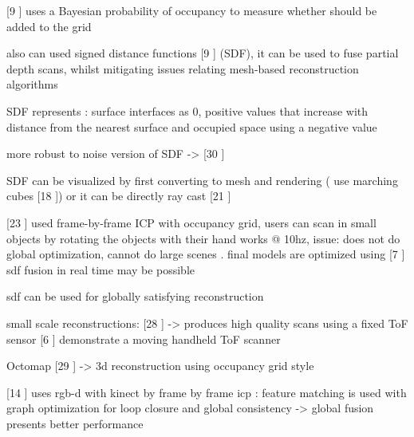 [9 \cite{Elfes87Sensor}] uses a Bayesian probability of occupancy to measure whether should be added to the grid

also can used signed distance functions [9 \cite{Elfes87Sensor}] (SDF), it can be used to fuse partial depth scans, whilst mitigating
issues relating mesh-based reconstruction algorithms

SDF represents : surface interfaces as 0, positive values that increase with distance from the nearest surface
and occupied space using a negative value

more robust to noise version of SDF -> [30 \cite{Zach07Globally} ]

SDF can be visualized by first converting to mesh and rendering ( use marching cubes [18 \cite{Cubes87High}]) or it can be directly ray cast [21 \cite{Parker98Interactive}]

[23 \cite{Rusinkiewicz02Real}] used frame-by-frame ICP with occupancy grid, users can scan in small objects by rotating the objects with their hand
works @ 10hz, issue: does not do global optimization, cannot do large scenes . final models are optimized using [7 \cite{Curless96Volumetric}]
sdf fusion in real time may be possible

sdf can be used for globally satisfying reconstruction

small scale reconstructions:
	[28 \cite{Weise09Hand}] -> produces high quality scans using a fixed ToF sensor
	[6 \cite{Cui103d} ] demonstrate a moving handheld ToF scanner

Octomap [29 \cite{Wurm10Octomap}] -> 3d reconstruction using occupancy grid style 

[14 \cite{Henry10Rgb}] uses rgb-d with kinect by frame by frame icp : feature matching is used with graph optimization for loop closure and global consistency -> global fusion presents better performance








































